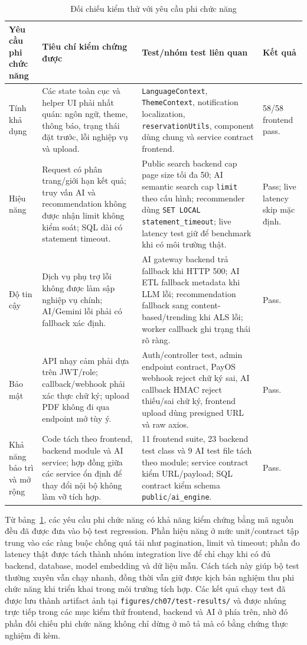 \begin{table}[H]
\centering
\scriptsize
\begin{tabularx}{\textwidth}{|p{3.1cm}|p{4.4cm}|X|p{2.1cm}|}
\hline
\textbf{Yêu cầu phi chức năng} & \textbf{Tiêu chí kiểm chứng được} & \textbf{Test/nhóm test liên quan} & \textbf{Kết quả} \\
\hline
Tính khả dụng & Các state toàn cục và helper UI phải nhất quán: ngôn ngữ, theme, thông báo, trạng thái đặt trước, lỗi nghiệp vụ và upload. & \texttt{LanguageContext}, \texttt{ThemeContext}, notification localization, \texttt{reservationUtils}, component dùng chung và service contract frontend. & 58/58 frontend pass. \\
\hline
Hiệu năng & Request có phân trang/giới hạn kết quả; truy vấn AI và recommendation không được nhận limit không kiểm soát; SQL dài có statement timeout. & Public search backend cap page size tối đa 50; AI semantic search cap \texttt{limit} theo cấu hình; recommender dùng \texttt{SET LOCAL statement\_timeout}; live latency test giữ để benchmark khi có môi trường thật. & Pass; live latency skip mặc định. \\
\hline
Độ tin cậy & Dịch vụ phụ trợ lỗi không được làm sập nghiệp vụ chính; AI/Gemini lỗi phải có fallback xác định. & AI gateway backend trả fallback khi HTTP 500; AI ETL fallback metadata khi LLM lỗi; recommendation fallback sang content-based/trending khi ALS lỗi; worker callback ghi trạng thái rõ ràng. & Pass. \\
\hline
Bảo mật & API nhạy cảm phải dựa trên JWT/role; callback/webhook phải xác thực chữ ký; upload PDF không đi qua endpoint mở tùy ý. & Auth/controller test, admin endpoint contract, PayOS webhook reject chữ ký sai, AI callback HMAC reject thiếu/sai chữ ký, frontend upload dùng presigned URL và raw axios. & Pass. \\
\hline
Khả năng bảo trì và mở rộng & Code tách theo frontend, backend module và AI service; hợp đồng giữa các service ổn định để thay đổi nội bộ không làm vỡ tích hợp. & 11 frontend suite, 23 backend test class và 9 AI test file tách theo module; service contract kiểm URL/payload; SQL contract kiểm schema \texttt{public}/\texttt{ai\_engine}. & Pass. \\
\hline
\end{tabularx}
\caption{Đối chiếu kiểm thử với yêu cầu phi chức năng}
\label{tab:nfr_test_mapping}
\end{table}

Từ bảng~\ref{tab:nfr_test_mapping}, các yêu cầu phi chức năng có khả năng
kiểm chứng bằng mã nguồn đều đã được đưa vào bộ test regression. Phần hiệu năng
ở mức unit/contract tập trung vào các ràng buộc chống quá tải như pagination,
limit và timeout; phần đo latency thật được tách thành nhóm integration live để
chỉ chạy khi có đủ backend, database, model embedding và dữ liệu mẫu. Cách tách
này giúp bộ test thường xuyên vẫn chạy nhanh, đồng thời vẫn giữ được kịch bản
nghiệm thu phi chức năng khi triển khai trong môi trường tích hợp. Các kết quả
chạy test đã được lưu thành artifact ảnh tại
\texttt{figures/ch07/test-results/} và được nhúng trực tiếp trong các mục kiểm
thử frontend, backend và AI ở phía trên, nhờ đó phần đối chiếu phi chức năng
không chỉ dừng ở mô tả mà có bằng chứng thực nghiệm đi kèm.
